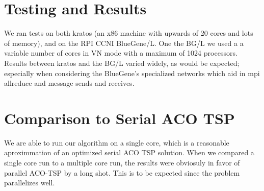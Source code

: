 \documentclass{acm_proc_article-sp}
\begin{document}
\section{Testing and Results}
We ran tests on both kratos (an x86 machine with upwards of 20 cores and lots of memory), and on the RPI CCNI BlueGene/L. One the BG/L we used a a variable number of cores in VN mode with a maximum of 1024 processors. Results between kratos and the BG/L varied widely, as would be expected; especially when considering the BlueGene's specialized networks which aid in mpi allreduce and message sends and receives.

\section{Comparison to Serial ACO TSP}
We are able to run our algorithm on a single core, which is a reasonable aproximmation of an optimized serial ACO TSP solution. When we compared a single core run to a multiple core run, the results were obviosuly in favor of parallel ACO-TSP by a long shot. This is to be expected since the problem parallelizes well.
\end{document}
